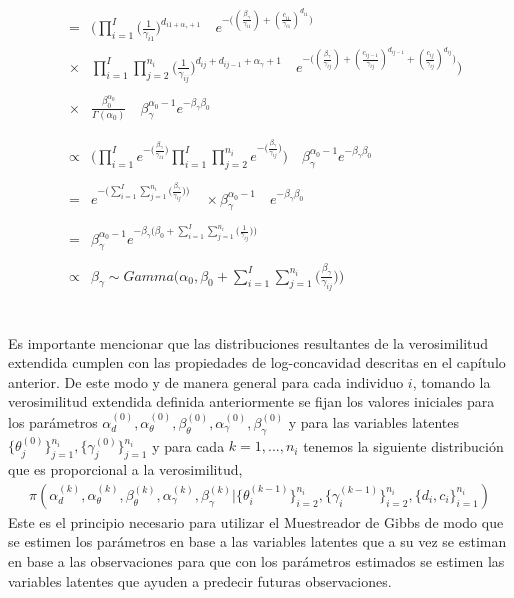 \begin{eqnarray*}
&=&\Bigg(\prod_{i=1}^I \bigg(\frac{1}{\gamma_{i1}}\bigg)^{d_{i1+\alpha_\gamma+1}}\quad e^{-\big((\frac{\beta_\gamma}{\gamma_{i1}})+(\frac{c_{i1}}{\gamma_{i1}})^{d_{i1}}\big)}\\
&\times& \prod_{i=1}^I \prod_{j=2}^{n_i} \bigg(\frac{1}{\gamma_{ij}}\bigg)^{d_{ij}+d_{ij-1}+\alpha_\gamma+1}\quad e^{-\big((\frac{\beta_\gamma}{\gamma_{ij}})+(\frac{c_{ij-1}}{\gamma_{ij}})^{d_{ij-1}}+(\frac{c_{ij}}{\gamma_{ij}})^{d_{ij}}\big)}\Bigg)\\
\\
&\times& \frac{\beta_0^{\alpha_0}}{\Gamma(\alpha_0)} \quad \beta_\gamma^{\alpha_0-1} e^{-\beta_\gamma\beta_0}\\
\\
\\
&\propto& \Bigg(\prod_{i=1}^I e^{-\big(\frac{\beta_\gamma}{\gamma_{i1}}\big)}\prod_{i=1}^I \prod_{j=2}^{n_i} e^{-\big(\frac{\beta_\gamma}{\gamma_{ij}}\big)}\Bigg) \quad \beta_\gamma^{\alpha_0-1} e^{-\beta_\gamma\beta_0}\\
\\
&=&e^{-\bigg(\sum_{i=1}^I \sum_{j=1}^{n_i}\big(\frac{\beta_\gamma}{\gamma_{ij}}\big)\bigg)}\quad \times \beta_\gamma^{\alpha_0-1}\quad e^{-\beta_\gamma\beta_0}\\
\\
&=& \beta_\gamma^{\alpha_0-1} e^{-\beta_\gamma\big(\beta_0+\sum_{i=1}^I \sum_{j=1}^{n_i}\big(\frac{1}{\gamma_{ij}}\big))}\\
\\
&\propto& \beta_\gamma \sim Gamma\Bigg(\alpha_0,\beta_0+\sum_{i=1}^I \sum_{j=1}^{n_i}\big(\frac{\beta_\gamma}{\gamma_{ij}}\big)\Bigg)
\end{eqnarray*}
\\
\\
Es importante mencionar que las distribuciones resultantes de la verosimilitud extendida cumplen con las propiedades de log-concavidad descritas en el cap\'itulo anterior. De este modo y de  manera general para cada individuo $i$, tomando la verosimilitud extendida definida anteriormente se fijan los valores iniciales para los par\'ametros $\alpha_d^{(0)},\alpha_\theta^{(0)},\beta_\theta^{(0)},\alpha_\gamma^{(0)},\beta_\gamma^{(0)}$ y para las variables latentes $\{\theta_j^{(0)}\}_{j=1}^{n_i},\{\gamma_j^{(0)}\}_{j=1}^{n_i}$ y para cada $k=1,...,n_i$ tenemos la siguiente distribuci\'on que es proporcional a la verosimilitud,
\begin{align*}
\pi(\alpha_d^{(k)},\alpha_\theta^{(k)},\beta_\theta^{(k)},\alpha_\gamma^{(k)},\beta_\gamma^{(k)}|\{\theta_i^{(k-1)}\}_{i=2}^{n_i},\{\gamma_i^{(k-1)}\}_{i=2}^{n_i},\{d_i,c_i\}_{i=1}^{n_i})
\end{align*}
Este es el principio necesario para utilizar el Muestreador de Gibbs de modo que se estimen los par\'ametros en base a las variables latentes que a su vez se estiman en base a las observaciones para que con los par\'ametros estimados se estimen las variables latentes que ayuden a predecir futuras observaciones. %

